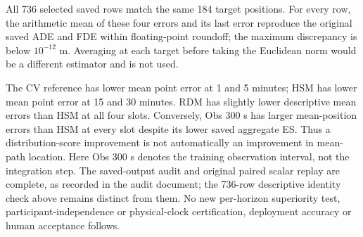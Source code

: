 All 736 selected saved rows match the same 184 target positions. For every row, the arithmetic mean of these four errors and its last error reproduce the original saved ADE and FDE within floating-point roundoff; the maximum discrepancy is below $10^{-12}$ m. Averaging at each target before taking the Euclidean norm would be a different estimator and is not used.

The CV reference has lower mean point error at 1 and 5 minutes; HSM has lower mean point error at 15 and 30 minutes. RDM has slightly lower descriptive mean errors than HSM at all four slots. Conversely, Obs 300 s has larger mean-position errors than HSM at every slot despite its lower saved aggregate ES. Thus a distribution-score improvement is not automatically an improvement in mean-path location. Here Obs 300 s denotes the training observation interval, not the integration step. The saved-output audit and original paired scalar replay are complete, as recorded in the audit document; the 736-row descriptive identity check above remains distinct from them. No new per-horizon superiority test, participant-independence or physical-clock certification, deployment accuracy or human acceptance follows.
\FloatBarrier

